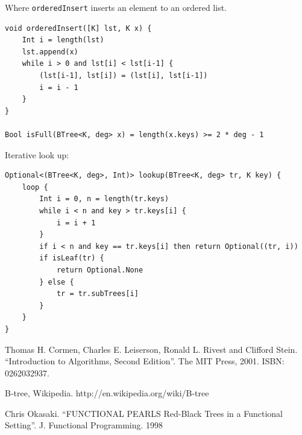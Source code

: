 \documentclass[b5paper]{article}
\begin{document}
Where \texttt{orderedInsert} inserts an element to an ordered list.

\begin{lstlisting}[language = Bourbaki]
void orderedInsert([K] lst, K x) {
    Int i = length(lst)
    lst.append(x)
    while i > 0 and lst[i] < lst[i-1] {
        (lst[i-1], lst[i]) = (lst[i], lst[i-1])
        i = i - 1
    }
}

Bool isFull(BTree<K, deg> x) = length(x.keys) >= 2 * deg - 1
\end{lstlisting}

Iterative look up:

\begin{lstlisting}[language = Bourbaki]
Optional<(BTree<K, deg>, Int)> lookup(BTree<K, deg> tr, K key) {
    loop {
        Int i = 0, n = length(tr.keys)
        while i < n and key > tr.keys[i] {
            i = i + 1
        }
        if i < n and key == tr.keys[i] then return Optional((tr, i))
        if isLeaf(tr) {
            return Optional.None
        } else {
            tr = tr.subTrees[i]
        }
    }
}
\end{lstlisting}

\ifx\wholebook\relax \else
\begin{thebibliography}{99}

Thomas H. Cormen, Charles E. Leiserson, Ronald L. Rivest and Clifford Stein. ``Introduction to Algorithms, Second Edition''. The MIT Press, 2001. ISBN: 0262032937.

B-tree, Wikipedia. http://en.wikipedia.org/wiki/B-tree

Chris Okasaki. ``FUNCTIONAL PEARLS Red-Black Trees in a Functional Setting''. J. Functional Programming. 1998

\end{thebibliography}

\expandafter\enddocument
\fi
\end{document}
